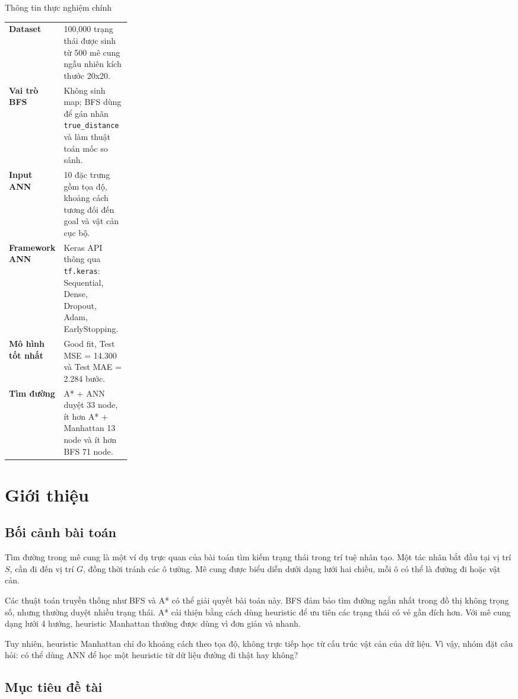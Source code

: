 \documentclass[12pt,a4paper]{article}
\begin{document}
\begin{keybox}{Thông tin thực nghiệm chính}
\begin{tabularx}{\linewidth}{>{\bfseries\color{Primary}}p{0.24\linewidth}Y}
Dataset & 100,000 trạng thái được sinh từ 500 mê cung ngẫu nhiên kích thước 20x20. \\
Vai trò BFS & Không sinh map; BFS dùng để gán nhãn \texttt{true\_distance} và làm thuật toán mốc so sánh. \\
Input ANN & 10 đặc trưng gồm tọa độ, khoảng cách tương đối đến goal và vật cản cục bộ. \\
Framework ANN & Keras API thông qua \texttt{tf.keras}: Sequential, Dense, Dropout, Adam, EarlyStopping. \\
Mô hình tốt nhất & Good fit, Test MSE = 14.300 và Test MAE = 2.284 bước. \\
Tìm đường & A* + ANN duyệt 33 node, ít hơn A* + Manhattan 13 node và ít hơn BFS 71 node. \\
\end{tabularx}
\end{keybox}

\section{Giới thiệu}

\subsection{Bối cảnh bài toán}

Tìm đường trong mê cung là một ví dụ trực quan của bài toán tìm kiếm trạng thái trong trí tuệ nhân tạo. Một tác nhân bắt đầu tại vị trí \(S\), cần đi đến vị trí \(G\), đồng thời tránh các ô tường. Mê cung được biểu diễn dưới dạng lưới hai chiều, mỗi ô có thể là đường đi hoặc vật cản.

Các thuật toán truyền thống như BFS và A* có thể giải quyết bài toán này. BFS đảm bảo tìm đường ngắn nhất trong đồ thị không trọng số, nhưng thường duyệt nhiều trạng thái. A* cải thiện bằng cách dùng heuristic để ưu tiên các trạng thái có vẻ gần đích hơn. Với mê cung dạng lưới 4 hướng, heuristic Manhattan thường được dùng vì đơn giản và nhanh.

Tuy nhiên, heuristic Manhattan chỉ đo khoảng cách theo tọa độ, không trực tiếp học từ cấu trúc vật cản của dữ liệu. Vì vậy, nhóm đặt câu hỏi: có thể dùng ANN để học một heuristic từ dữ liệu đường đi thật hay không?

\subsection{Mục tiêu đề tài}
\end{document}
